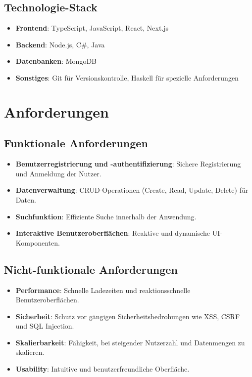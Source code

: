 \documentclass[a4paper,12pt]{article}
\begin{document}
\subsection{Technologie-Stack}
\begin{itemize}
    \item \textbf{Frontend}: TypeScript, JavaScript, React, Next.js
    \item \textbf{Backend}: Node.js, C\#, Java
    \item \textbf{Datenbanken}: MongoDB
    \item \textbf{Sonstiges}: Git für Versionskontrolle, Haskell für spezielle Anforderungen
\end{itemize}

\section{Anforderungen}

\subsection{Funktionale Anforderungen}
\begin{itemize}
    \item \textbf{Benutzerregistrierung und -authentifizierung}: Sichere Registrierung und Anmeldung der Nutzer.
    \item \textbf{Datenverwaltung}: CRUD-Operationen (Create, Read, Update, Delete) für Daten.
    \item \textbf{Suchfunktion}: Effiziente Suche innerhalb der Anwendung.
    \item \textbf{Interaktive Benutzeroberflächen}: Reaktive und dynamische UI-Komponenten.
\end{itemize}

\subsection{Nicht-funktionale Anforderungen}
\begin{itemize}
    \item \textbf{Performance}: Schnelle Ladezeiten und reaktionsschnelle Benutzeroberflächen.
    \item \textbf{Sicherheit}: Schutz vor gängigen Sicherheitsbedrohungen wie XSS, CSRF und SQL Injection.
    \item \textbf{Skalierbarkeit}: Fähigkeit, bei steigender Nutzerzahl und Datenmengen zu skalieren.
    \item \textbf{Usability}: Intuitive und benutzerfreundliche Oberfläche.
\end{itemize}
\end{document}
